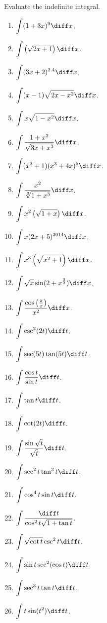 Evaluate the indefinite integral.
\begin{multicols}{3}
\begin{enumerate}
\item $\displaystyle\int (1+3x)^9 \diff x $.

\item $\displaystyle\int \left(\sqrt{2x+1}\right)\diff x $.

\item $\displaystyle\int (3x+2)^{2.4}\diff x $.

\item $\displaystyle\int (x-1)\sqrt{2x-x^2} \diff x $.

\item $\displaystyle\int x\sqrt{1-x^2} \diff x $.

\answer{$\displaystyle $}
\item $\displaystyle\int \frac{1+x^2}{\sqrt{3x+x^3}}\diff x $.
\item $\displaystyle\int (x^2+1)(x^3+4x)^5 \diff x $.
\item $\displaystyle\int \frac{x^2}{\sqrt[3]{1+x^3}} \diff x $.
\item $\displaystyle\int x^2\left(\sqrt{1+x}\right)\diff x $.
\item $\displaystyle\int x(2x+5)^{2014} \diff x $.
\item $\displaystyle\int x^3\left(\sqrt{x^2+1}\right) \diff x $.

\item $\displaystyle\int \sqrt{x}\sin (2+x^{\frac{3}{2}}) \diff x $.
\item $\displaystyle\int \frac{\cos\left(\frac{\pi}{x}\right)}{x^2} \diff x $.

\item $\displaystyle\int \csc^2(2t) \diff t$.
\item $\displaystyle \int \sec (5t) \tan (5t) \diff t $.
\item $\displaystyle\int \frac{\cos t}{\sin t} \diff t $.
\item $\displaystyle\int \tan t \diff t $.
\item $\displaystyle\int \cot (2t) \diff t $.
\item $\displaystyle\int \frac{\sin \sqrt{t}}{\sqrt{t}} \diff t $.
\item $\displaystyle\int \sec^2t \tan^3t \diff t$.
\item $\displaystyle\int \cos^4t\sin t \diff t$.
\item $\displaystyle\int \frac{\diff t}{\cos^2 t\sqrt{1+\tan t}} $.
\item $\displaystyle\int \sqrt{\cot t} \csc^2 t\diff t $.
\item $\displaystyle\int \sin t \sec^2(\cos t)\diff t $.
\item $\displaystyle\int \sec^3 t \tan t\diff t $.
\item $\displaystyle\int t \sin(t^2) \diff t $.

\end{enumerate}
\end{multicols}

